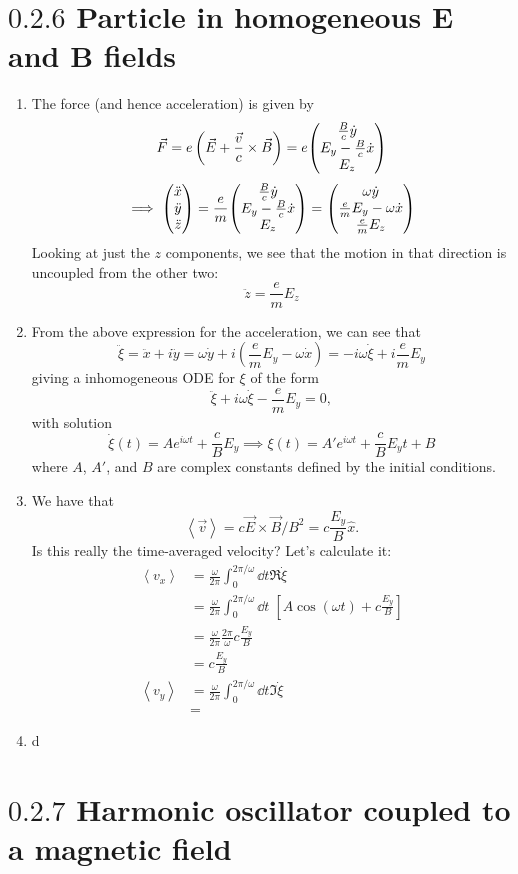 \documentclass[12pt]{article}
\newcommand{\avg}[1]{\left<#1\right>}
\begin{document}
\section*{$0.2.6$ Particle in homogeneous $\mathbf{E}$ and $\mathbf{B}$ fields}
\begin{enumerate}[label=(\alph*)]
    \item The force (and hence acceleration) is given by
    \[ \vec{F} = e\left(\vec{E} + \frac{\vec{v}}{c}\times\vec{B}\right) = e\mqty(\frac{B}{c}\dot{y} \\ E_y - \frac{B}{c}\dot{x} \\ E_z)  \]
    \[ \implies \mqty(\ddot{x} \\ \ddot{y} \\ \ddot{z}) = \frac{e}{m}\mqty(\frac{B}{c}\dot{y} \\ E_y - \frac{B}{c}\dot{x} \\ E_z) = \mqty(\omega\dot{y} \\ \frac{e}{m}E_y - \omega\dot{x} \\ \frac{e}{m}E_z)\]
    Looking at just the $z$ components, we see that the motion in that direction is uncoupled from the other two:
    \[ \ddot{z} = \frac{e}{m}E_z \]

    \item From the above expression for the acceleration, we can see that
    \[ \ddot{\xi} = \ddot{x} + i\ddot{y} = \omega\dot{y} + i\left(\frac{e}{m}E_y - \omega\dot{x}\right) = -i\omega\dot{\xi} + i\frac{e}{m}E_y \]
    giving a inhomogeneous ODE for $\xi$ of the form
    \[ \ddot{\xi} + i\omega\dot{\xi} - \frac{e}{m}E_y = 0, \]
    with solution
    \[ \dot{\xi}(t) = Ae^{i\omega t} + \frac{c}{B}E_y \implies \xi(t) = A'e^{i\omega t} + \frac{c}{B}E_yt + B\]
    where $A$, $A'$, and $B$ are complex constants defined by the initial conditions.
    
    \item We have that
    \[ \avg{\vec{v}} = c\vec{E}\times\vec{B}/B^2 = c\frac{E_y}{B}\hat{x}. \]
    Is this really the time-averaged velocity? Let's calculate it:
    \begin{align*}
        \avg{v_x} &= \frac{\omega}{2\pi}\int_0^{2\pi/\omega}\dd t \Re{\dot{\xi}} \\
        &= \frac{\omega}{2\pi}\int_0^{2\pi/\omega}\dd t\; \left[A\cos(\omega t) + c\frac{E_y}{B}\right] \\
        &= \frac{\omega}{2\pi}\frac{2\pi}{\omega}c\frac{E_y}{B} \\
        &= c\frac{E_y}{B} \\
        \avg{v_y} &= \frac{\omega}{2\pi}\int_0^{2\pi/\omega}\dd t \Im{\dot{\xi}} \\
        &= 
    \end{align*}
    
    \item d
\end{enumerate}


\section*{$0.2.7$ Harmonic oscillator coupled to a magnetic field}
\end{document}
